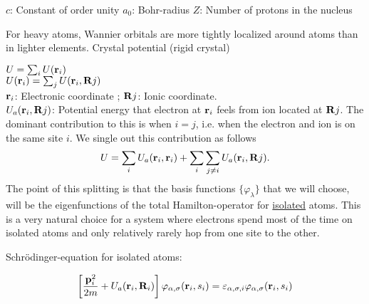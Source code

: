 \noindent $c$: Constant of order unity \newline
\noindent $a_0$: Bohr-radius\newline
\noindent $Z$: Number of protons in the nucleus\newline

\noindent For heavy atoms, Wannier orbitals are more tightly localized around atoms than in lighter elements. \newline
Crystal potential (rigid crystal) \newline

\noindent $U= \sum_i U(\vb{r}_i) $ \\
\noindent $U(\vb{r}_i)= \sum_j U(\vb{r}_i, \vb{R}j)$\\
\noindent $\vb{r}_i$: Electronic coordinate ; $\vb{R}j$: Ionic coordinate.\\

\noindent $U_a(\vb{r}_i, \vb{R}j)$: Potential energy that electron at $\vb{r}_i$ feels from ion located at $\vb{R}j$. The dominant contribution to this is when $i=j$, i.e. when the electron and ion is on the same site $i$. We single out this contribution as follows
\begin{align*}
	U = \sum_i U_a(\vb{r}_i, \vb{r}_i) + \sum_i \sum_{j\neq i}  U_a(\vb{r}_i, \vb{R}j).
\end{align*}
\noindent The point of this splitting is that the basis functions $\{\varphi_\lambda \}$ that we will choose, will be the eigenfunctions of the total Hamilton-operator for \uline{isolated} atoms. This is a very natural choice for a system where electrons spend most of the time on isolated atoms and only relatively rarely hop from one site to the other.\newline

\noindent Schrödinger-equation for isolated atoms:

\begin{align*}
	\left[\frac{\vb{p}_i^2}{2m}+ U_a( \vb{r}_i, \vb{R}_i)\right] \varphi_{\alpha, \sigma}( \vb{r}_i, s_i)= \varepsilon_{\alpha,\sigma, i} \varphi_{\alpha, \sigma}( \vb{r}_i, s_i)
\end{align*}


